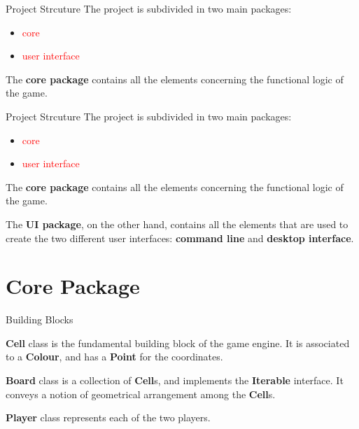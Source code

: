 \documentclass{beamer}
\begin{document}
 \begin{frame}{Project  Strcuture}
  The project is subdivided in two main packages:
  \begin{itemize}
        \item \textcolor{red}{core}
        \item \textcolor{red}{user interface}
   \end{itemize}

 \vspace{1em}

  The \textbf{core package}  contains all the elements concerning the functional logic of the game.

 \vspace{2em}

	
 \end{frame}

 \begin{frame}{Project  Strcuture}
  The project is subdivided in two main packages:
  \begin{itemize}
        \item \textcolor{red}{core}
        \item \textcolor{red}{user interface}
   \end{itemize}

 \vspace{1em}

  The \textbf{core package}  contains all the elements concerning the functional logic of the game.

 \vspace{1em}

 The \textbf{UI package}, on the other hand, contains all the elements that are used to create the two different user interfaces: \textbf{command line} and \textbf{desktop interface}.
	
 \end{frame}



\section{Core Package}

  \begin{frame}{Building Blocks}

    \textbf{Cell} class is the fundamental building block of the game engine. It is associated to a \textbf{Colour}, and has a \textbf{Point} for the coordinates.

    \vspace{1em}

    \textbf{Board} class is a collection of \textbf{Cell}s, and implements the \textbf{Iterable} interface. It conveys a notion of geometrical arrangement among the \textbf{Cell}s.

    \vspace{1em}

    \textbf{Player} class represents each of the two players.

    \end{frame}
\end{document}
